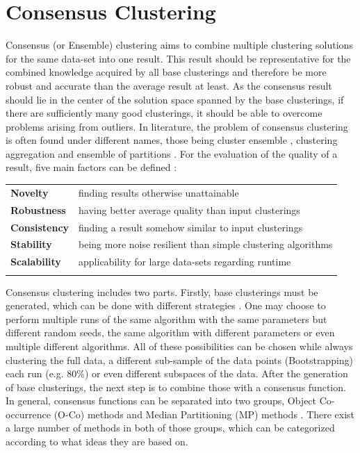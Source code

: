 \documentclass[
	a4paper,
	english,
	twoside,
	openright,               
	11pt                            
	]{report}
\begin{document}
\section{Consensus Clustering}\label{sec:consensus}
Consensus (or Ensemble) clustering aims to combine multiple clustering solutions for the same data-set into one result. This result should be representative for the combined knowledge acquired by all base clusterings and therefore be more robust and accurate than the average result at least. As the consensus result should lie in the center of the solution space spanned by the base clusterings, if there are sufficiently many good clusterings, it should be able to overcome problems arising from outliers. In literature, the problem of consensus clustering is often found under different names, those being cluster ensemble \cite{BOONGOEN20181}, clustering aggregation \cite{Gionis2005ClusteringA} and ensemble of partitions \cite{ensemblepartitions}. For the evaluation of the quality of a result, five main factors can be defined \cite{Ghaemi2009ASC,survey1}:\newline

\begin{table}[ht]

\begin{tabular}{ll}
	\textbf{Novelty} & finding results otherwise unattainable \\
	\textbf{Robustness} & having better average quality than input clusterings \\
	\textbf{Consistency}   & finding a result somehow similar to input clusterings \\
	\textbf{Stability} & being more noise resilient than simple clustering algorithms \\
	\textbf{Scalability} & applicability for large data-sets regarding runtime \\
	&
\end{tabular}
\end{table}

Consensus clustering includes two parts. Firstly, base clusterings must be generated, which can be done with different strategies \cite{BOONGOEN20181}. One may choose to perform multiple runs of the same algorithm with the same parameters but different random seeds, the same algorithm with different parameters or even multiple different algorithms. All of these possibilities can be chosen while always clustering the full data, a different sub-sample of the data points (Bootstrapping) \cite{bootstrapping} each run (e.g. 80\%) or even different subspaces of the data. After the generation of base clusterings, the next step is to combine those with a consensus function. In general, consensus functions can be separated into two groups, Object Co-occurrence (O-Co) methods and Median Partitioning (MP) methods \cite{survey1}. There exist a large number of methods in both of those groups, which can be categorized according to what ideas they are based on.
\end{document}
